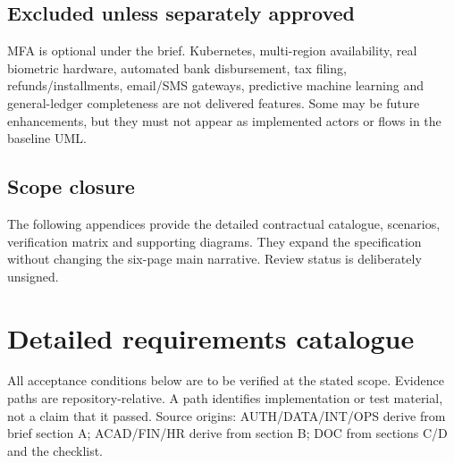 \documentclass[10pt,a4paper]{article}
\begin{document}
\subsection{Excluded unless separately approved}
MFA is optional under the brief. Kubernetes, multi-region availability, real
biometric hardware, automated bank disbursement, tax filing, refunds/installments,
email/SMS gateways, predictive machine learning and general-ledger completeness
are not delivered features. Some may be future enhancements, but they must not
appear as implemented actors or flows in the baseline UML.

\subsection{Scope closure}
The following appendices provide the detailed contractual catalogue, scenarios,
verification matrix and supporting diagrams. They expand the specification without
changing the six-page main narrative. Review status is deliberately unsigned.

\clearpage
\section{Detailed requirements catalogue}\label{app:catalogue}
All acceptance conditions below are to be verified at the stated scope. Evidence
paths are repository-relative. A path identifies implementation or test material,
not a claim that it passed. Source origins: AUTH/DATA/INT/OPS derive from brief
section A; ACAD/FIN/HR derive from section B; DOC from sections C/D and the checklist.
\end{document}
